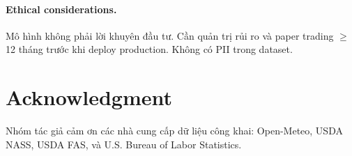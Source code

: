 \documentclass[conference]{IEEEtran}
\begin{document}
\paragraph{Ethical considerations.}
Mô hình không phải lời khuyên đầu tư. Cần quản trị rủi ro và paper trading
$\geq$12 tháng trước khi deploy production. Không có PII trong dataset.

\section*{Acknowledgment}

Nhóm tác giả cảm ơn các nhà cung cấp dữ liệu công khai: Open-Meteo,
USDA NASS, USDA FAS, và U.S. Bureau of Labor Statistics.

\end{document}
